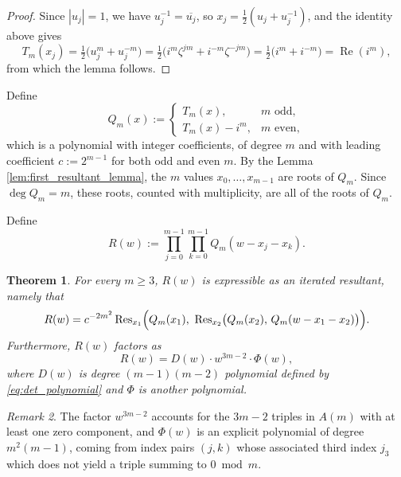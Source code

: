 \documentclass[11pt,reqno]{amsart}
\newtheorem{theorem}{Theorem}[section]
\theoremstyle{remark}
\newtheorem{remark}[theorem]{Remark}
\begin{document}
\begin{proof}
Since $|u_j|=1$, we have $u_j^{-1}=\overline{u_j}$, so $x_j = \tfrac12(u_j+u_j^{-1})$, and the
identity above gives
\[
T_m(x_j) = \tfrac12\bigl(u_j^m+u_j^{-m}\bigr) = \tfrac12\bigl(i^m\zeta^{jm}+i^{-m}\zeta^{-jm}\bigr)
= \tfrac12\bigl(i^m+i^{-m}\bigr) = \operatorname{Re}(i^m),
\]
from which the lemma follows.
\end{proof}

Define
\[
Q_m(x) :=
\begin{cases}
T_m(x), & m \text{ odd},\\[2pt]
T_m(x) - i^m, & m \text{ even},
\end{cases}
\]
which is a polynomial with integer coefficients, of degree
$m$ and with leading coefficient $c := 2^{m-1}$  for both odd and even $m$. By the Lemma
\ref{lem:first_resultant_lemma}, the $m$
values $x_0,\dots,x_{m-1}$ are roots of $Q_m$. Since $\deg Q_m = m$, these roots, counted with
multiplicity, are all of the roots of $Q_m$.

Define
\[
R(w) := \prod_{j=0}^{m-1}\prod_{k=0}^{m-1} Q_m(w - x_j - x_k).
\]

\begin{theorem}
For every $m \geq 3$, $R(w)$ is expressible as an iterated resultant, namely that
\[
R(w) = c^{-2m^2}\operatorname{Res}_{x_1}\Bigl(Q_m(x_1),\ \operatorname{Res}_{x_2}\bigl(Q_m(x_2),\, Q_m(w-x_1-x_2)\bigr)\Bigr).
\]
Furthermore, $R(w)$ factors as
\[
R(w) = D(w)\cdot w^{3m-2}\cdot \Phi(w),
\]
where $D(w)$ is degree $(m-1)(m-2)$ polynomial defined by \eqref{eq:det_polynomial} and $\Phi$ is another polynomial.
\end{theorem}


\begin{remark}
The factor
$w^{3m-2}$ accounts for the $3m-2$ triples in $A(m)$ with at least one zero component, and $\Phi(w)$
is an explicit polynomial of degree $m^2(m-1)$, coming from index pairs $(j,k)$ whose associated
third index $j_3$  which does not yield a triple summing to $0 \bmod m$.
\end{remark}
\end{document}
